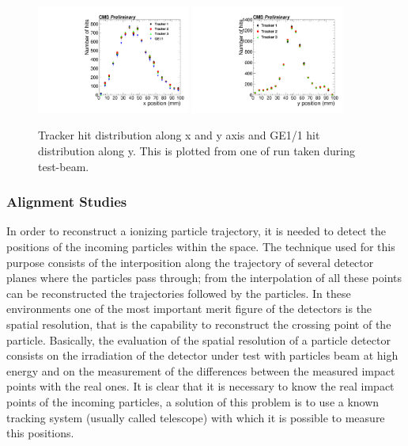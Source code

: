 \begin{figure}[!htbp]
\centering
\includegraphics[width=0.45\textwidth]{figures/GEM/Tracker_Hit_position_Run1644_x.pdf}%
\includegraphics[width=0.45\textwidth]{figures/GEM/Tracker_Hit_position_Run1644_y.pdf}
\caption{Tracker hit distribution along x and y axis and GE1/1 hit distribution along y. This is plotted from one of run taken during test-beam.}
\label{HitPosXaxis}
\end{figure}

\subsubsection{Alignment Studies}

In order to reconstruct a ionizing particle trajectory, it is needed to detect the positions of the incoming particles within the space. The technique used for this purpose consists of the interposition along the trajectory of several detector planes where the particles pass through; from the interpolation of all these points can be reconstructed the trajectories followed by the particles. In these environments one of the most important merit figure of the detectors is the spatial resolution, that is the capability to reconstruct the crossing point of the particle. Basically, the evaluation of the spatial resolution of a particle detector consists on the irradiation of the detector under test with particles beam at high energy and on the measurement of the differences between the measured impact points with the real ones. It is clear that it is necessary to know the real impact points of the incoming particles, a solution of this problem is to use a known tracking system (usually called telescope) with which it is possible to measure this positions.

